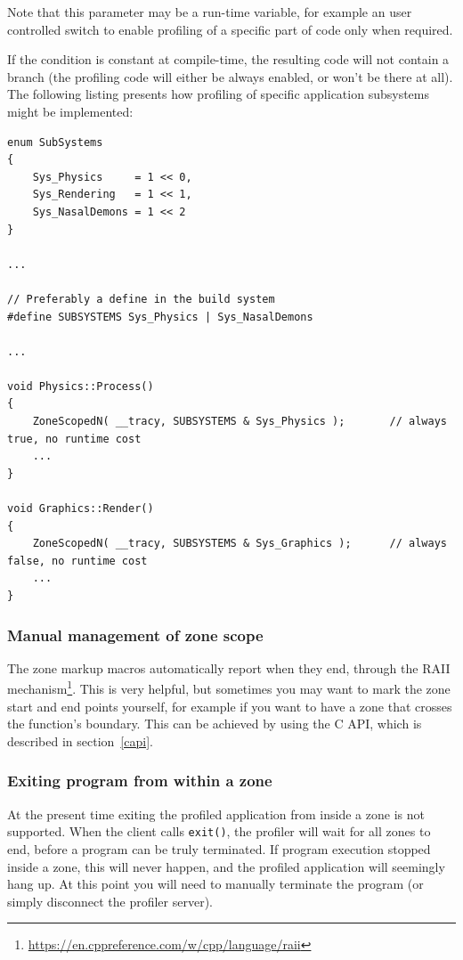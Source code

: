 \documentclass[hidelinks,titlepage,a4paper]{article}
\begin{document}
Note that this parameter may be a run-time variable, for example an user controlled switch to enable profiling of a specific part of code only when required.

If the condition is constant at compile-time, the resulting code will not contain a branch (the profiling code will either be always enabled, or won't be there at all). The following listing presents how profiling of specific application subsystems might be implemented:

\begin{lstlisting}
enum SubSystems
{
	Sys_Physics		= 1 << 0,
	Sys_Rendering	= 1 << 1,
	Sys_NasalDemons	= 1 << 2
}

...

// Preferably a define in the build system
#define SUBSYSTEMS Sys_Physics | Sys_NasalDemons

...

void Physics::Process()
{
	ZoneScopedN( __tracy, SUBSYSTEMS & Sys_Physics );		// always true, no runtime cost
	...
}

void Graphics::Render()
{
	ZoneScopedN( __tracy, SUBSYSTEMS & Sys_Graphics );		// always false, no runtime cost
	...
}
\end{lstlisting}

\subsubsection{Manual management of zone scope}

The zone markup macros automatically report when they end, through the RAII mechanism\footnote{\url{https://en.cppreference.com/w/cpp/language/raii}}. This is very helpful, but sometimes you may want to mark the zone start and end points yourself, for example if you want to have a zone that crosses the function's boundary. This can be achieved by using the C API, which is described in section~\ref{capi}.

\subsubsection{Exiting program from within a zone}

At the present time exiting the profiled application from inside a zone is not supported. When the client calls \texttt{exit()}, the profiler will wait for all zones to end, before a program can be truly terminated. If program execution stopped inside a zone, this will never happen, and the profiled application will seemingly hang up. At this point you will need to manually terminate the program (or simply disconnect the profiler server).
\end{document}
